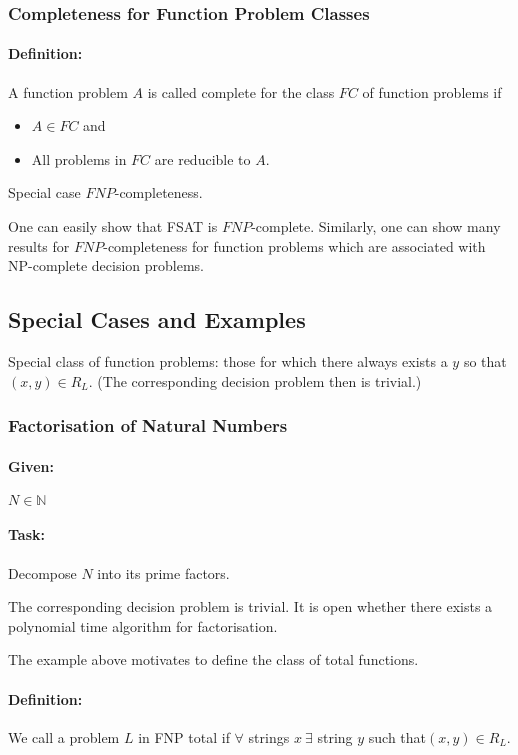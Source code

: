 \documentclass[11pt]{article}
\theoremstyle{definition}
\theoremstyle{definition}
\begin{document}
\subsubsection{Completeness for Function Problem Classes}

\paragraph{Definition:} A function problem $ A $ is called complete for the class $ FC $ of function problems if
\begin{itemize}
\item $ A \in FC $ and
\item All problems in $ FC $ are reducible to $ A $.
\end{itemize}

Special case $ FNP$-completeness.

One can easily show that FSAT is $ FNP $-complete. Similarly, one can show many results for $ FNP$-completeness for function problems which are associated with NP-complete decision problems.

\subsection{Special Cases and Examples}

Special class of function problems: those for which there always exists a $ y $ so that $ (x, y) \in R_L $. (The corresponding decision problem then is trivial.)

\subsubsection{Factorisation of Natural Numbers}
\paragraph{Given:} $ N \in \mathbb{N} $
\paragraph{Task:} Decompose $ N $ into its prime factors.

The corresponding decision problem is trivial. It is open whether there exists a polynomial time algorithm for factorisation.

The example above motivates to define the class of total functions.

\paragraph{Definition:} We call a problem $ L $ in FNP total if $ \forall $ strings $ x ~\exists $ string $ y $ such that$ (x, y) \in R_L $.
\end{document}
